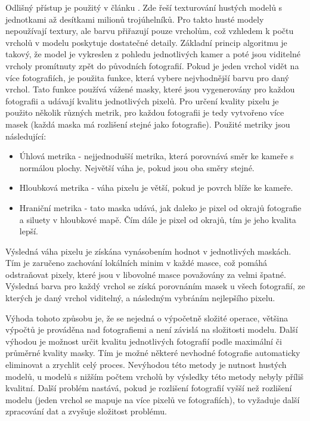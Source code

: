 \documentclass[11pt,twoside,a4paper]{book}
\begin{document}
Odlišný přístup je použitý v článku \cite{masked-blending}. Zde řeší texturování
hustých modelů s jednotkami až desítkami milionů trojúhelníků. Pro takto husté
modely nepoužívají textury, ale barvu přiřazují pouze vrcholům, což vzhledem k
počtu vrcholů v modelu poskytuje dostatečné detaily. Základní princip algoritmu
je takový, že model je vykreslen z pohledu jednotlivých kamer a poté jsou
viditelné vrcholy promítnuty zpět do původních fotografií. Pokud je jeden vrchol
vidět na více fotografiích, je použita funkce, která vybere nejvhodnější barvu
pro daný vrchol. Tato funkce používá vážené masky, které jsou vygenerovány pro
každou fotografii a udávají kvalitu jednotlivých pixelů. Pro určení kvality
pixelu je použito několik různých metrik, pro každou fotografii je tedy
vytvořeno více masek (každá maska má rozlišení stejné jako fotografie). Použité
metriky jsou následující:
\begin{itemize}
  \item Úhlová metrika - nejjednodušší metrika, která porovnává směr ke kameře s 
  		normálou plochy. Největší váha je, pokud jsou oba směry stejné.
  \item Hloubková metrika - váha pixelu je větší, pokud je povrch blíže ke 
  		kameře.
  \item Hraniční metrika - tato maska udává, jak daleko je pixel od okrajů 
  		fotografie a siluety v hloubkové mapě. Čím dále je pixel od okrajů, 
  		tím je jeho kvalita lepší.
\end{itemize}
Výsledná váha pixelu je získána vynásobením hodnot v jednotlivých maskách. Tím 
je zaručeno zachování lokálních minim v každé masce, což pomáhá odstraňovat 
pixely, které jsou v libovolné masce považovány za velmi špatné. Výsledná barva 
pro každý vrchol se získá porovnáním masek u všech fotografií, ze kterých je daný 
vrchol viditelný, a následným vybráním nejlepšího pixelu.

Výhoda tohoto způsobu je, že se nejedná o výpočetně složité operace, většina
výpočtů je prováděna nad fotografiemi a není závislá na složitosti modelu. Další
výhodou je možnost určit kvalitu jednotlivých fotografií podle maximální či
průměrné kvality masky. Tím je možné některé nevhodné fotografie automaticky
eliminovat a zrychlit celý proces. Nevýhodou této metody je nutnost hustých
modelů, u modelů s nižším počtem vrcholů by výsledky této metody nebyly příliš
kvalitní. Další problém nastává, pokud je rozlišení fotografií vyšší než
rozlišení modelu (jeden vrchol se mapuje na více pixelů ve fotografiích), to
vyžaduje další zpracování dat a zvyšuje složitost problému.
\end{document}
